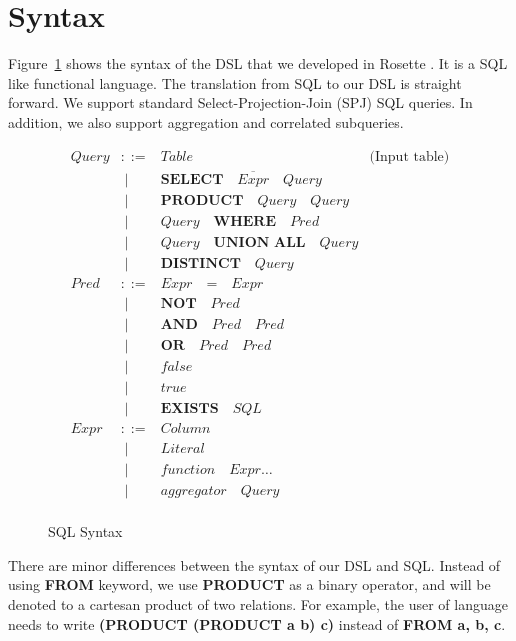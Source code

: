 \section{Syntax}

Figure~\ref{tab:sql-syntax} shows the syntax of the DSL that we developed
in Rosette \cite{rosette}. It is a SQL like functional language. The 
translation from SQL to our DSL is straight forward. We support standard
Select-Projection-Join (SPJ) SQL queries. In addition, we also support 
aggregation and correlated subqueries. 

\begin{figure}[t]
\centering
\[
\begin{array}{llll}
  Query & ::=  &  \mathit{Table} & \text{(Input table)} \\
        & \; \mid & \textbf{SELECT} \quad \overline{Expr} \quad  Query      \\ 
        & \; \mid  & \textbf{PRODUCT} \quad Query \quad Query        \\
        & \; \mid & Query \quad \textbf{WHERE} \quad Pred        \\
        & \; \mid & Query \quad \textbf{UNION ALL} \quad Query   \\
        & \; \mid & \textbf{DISTINCT} \quad Query                \\
  Pred & ::= & Expr \quad \textbf{=} \quad Expr \\
       & \; \mid &  \textbf{NOT} \quad Pred      \\
       & \; \mid & \textbf{AND} \quad Pred \quad Pred      \\ 
       & \; \mid & \textbf{OR} \quad Pred \quad Pred \\
       & \; \mid & false \\
       & \; \mid & true  \\
       & \; \mid & \textbf{EXISTS} \quad SQL \\
  Expr & ::= & Column                     \\
        & \; \mid & Literal                  \\
        & \; \mid & function \quad Expr \ldots     \\
        & \; \mid & aggregator \quad Query   \\  
\end{array}
\]
\caption{SQL Syntax}
\label{tab:sql-syntax}
\end{figure}

There are minor differences between the syntax of our DSL and SQL. Instead of using \textbf{FROM} keyword, we use \textbf{PRODUCT} as 
a binary operator, and will be denoted to a cartesan product of 
two relations. For example, the user of language needs to write 
\textbf{(PRODUCT (PRODUCT a b) c)} instead of \textbf{FROM a, b, c}.  

